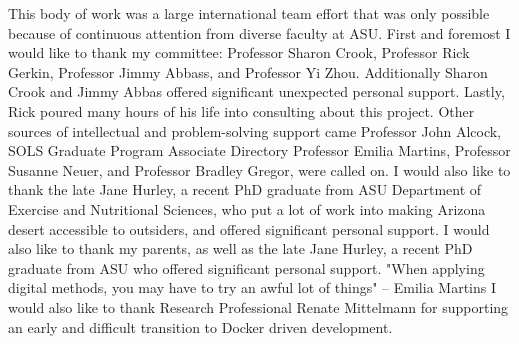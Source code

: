 This body of work was a large international team effort that was only possible because of continuous attention from diverse faculty at ASU. 
\linebreak 
\linebreak 
First and foremost I would like to thank my committee: Professor Sharon Crook, Professor Rick Gerkin, Professor Jimmy Abbass, and Professor Yi Zhou. 
Additionally Sharon Crook and Jimmy Abbas offered significant unexpected personal support.
Lastly, Rick poured many hours of his life into consulting about this project.
\linebreak 
\linebreak 
Other sources of intellectual and problem-solving support came Professor John Alcock, SOLS Graduate Program Associate Directory Professor Emilia Martins, Professor Susanne Neuer, and Professor Bradley Gregor, were called on.
\linebreak 
\linebreak 
I would also like to thank the late Jane Hurley, a recent PhD graduate from ASU Department of Exercise and Nutritional Sciences, who put a lot of work into making Arizona desert accessible to outsiders, and offered significant personal support.
\linebreak 
\linebreak 
I would also like to thank my parents, as well as the late Jane Hurley, a recent PhD graduate from ASU who offered significant personal support.
\linebreak 
\linebreak 
"When applying digital methods, you may have to try an awful lot of things" -- Emilia Martins
\linebreak 
\linebreak 
I would also like to thank Research Professional Renate Mittelmann for supporting an early and difficult transition to Docker driven development.
